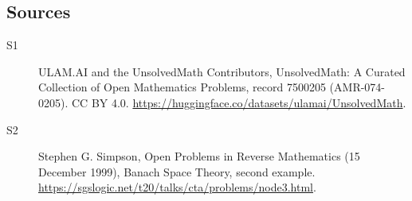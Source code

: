 \documentclass[11pt]{article}
\begin{document}
\subsection{Sources}
\begin{description}
\item[\hypertarget{source:7500205:1}{S1}] ULAM.AI and the UnsolvedMath Contributors, UnsolvedMath: A Curated Collection of Open Mathematics Problems, record 7500205 (AMR-074-0205). CC BY 4.0. \url{https://huggingface.co/datasets/ulamai/UnsolvedMath}.
\item[\hypertarget{source:7500205:2}{S2}] Stephen G. Simpson, Open Problems in Reverse Mathematics (15 December 1999), Banach Space Theory, second example. \url{https://sgslogic.net/t20/talks/cta/problems/node3.html}.
\end{description}
\label{end:7500205}
\end{document}
